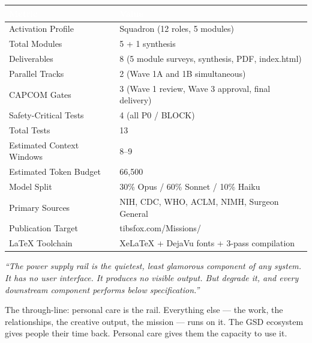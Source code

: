 \documentclass[11pt,letterpaper]{article}
\newcommand{\tableheader}[1]{\textbf{\sffamily\textcolor{white}{#1}}}
\begin{document}
\begin{center}
\begin{tabularx}{\textwidth}{L{5cm}X}
\toprule
{}
\tableheader{Metric} & \tableheader{Value} \\
\midrule
Activation Profile & Squadron (12 roles, 5 modules) \\
Total Modules & 5 + 1 synthesis \\
Deliverables & 8 (5 module surveys, synthesis, PDF, index.html) \\
Parallel Tracks & 2 (Wave 1A and 1B simultaneous) \\
CAPCOM Gates & 3 (Wave 1 review, Wave 3 approval, final delivery) \\
Safety-Critical Tests & 4 (all P0 / BLOCK) \\
Total Tests & 13 \\
Estimated Context Windows & 8--9 \\
Estimated Token Budget & 66,500 \\
Model Split & 30\% Opus / 60\% Sonnet / 10\% Haiku \\
Primary Sources & NIH, CDC, WHO, ACLM, NIMH, Surgeon General \\
Publication Target & tibsfox.com/Missions/ \\
LaTeX Toolchain & XeLaTeX + DejaVu fonts + 3-pass compilation \\
\bottomrule
\end{tabularx}
\end{center}

\vspace{2em}
\begin{quotebox}
\textit{``The power supply rail is the quietest, least glamorous component of any system. It has no user interface. It produces no visible output. But degrade it, and every downstream component performs below specification.''}

\vspace{0.5em}
{\small\sffamily\textcolor{subtlegray}{The through-line: personal care is the rail. Everything else --- the work, the relationships, the creative output, the mission --- runs on it. The GSD ecosystem gives people their time back. Personal care gives them the capacity to use it.}}
\end{quotebox}
\end{document}
